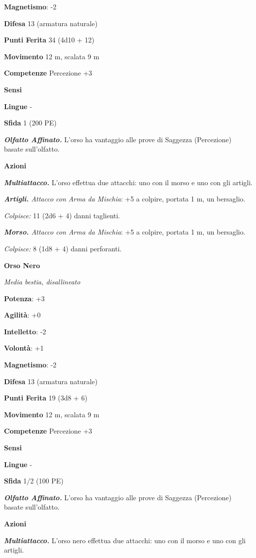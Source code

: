 \begin{multicols}{2}
\textbf{Magnetismo}: -2

\textbf{Difesa} 13 (armatura naturale)

\textbf{Punti Ferita} 34 (4d10 + 12)

\textbf{Movimento} 12 m, scalata 9 m

\textbf{Competenze} Percezione +3

\textbf{Sensi} 

\textbf{Lingue} -

\textbf{Sfida} 1 (200 PE)\smallskip

\emph{\textbf{Olfatto Affinato.}} L'orso ha vantaggio alle prove di
Saggezza (Percezione) basate sull'olfatto.

\smallskip\textbf{Azioni}

\emph{\textbf{Multiattacco.}} L'orso effettua due attacchi: uno con il
morso e uno con gli artigli.

\emph{\textbf{Artigli.} Attacco con Arma da Mischia}: +5 a colpire,
portata 1 m, un bersaglio.

\emph{Colpisce:} 11 (2d6 + 4) danni taglienti.

\emph{\textbf{Morso.} Attacco con Arma da Mischia}: +5 a colpire,
portata 1 m, un bersaglio.

\emph{Colpisce:} 8 (1d8 + 4) danni perforanti.

\textbf{Orso Nero}

\emph{Media bestia, disallineato}

\textbf{Potenza}: +3

\textbf{Agilità}: +0

\textbf{Intelletto}: -2

\textbf{Volontà}: +1

\textbf{Magnetismo}: -2

\textbf{Difesa} 13 (armatura naturale)

\textbf{Punti Ferita} 19 (3d8 + 6)

\textbf{Movimento} 12 m, scalata 9 m

\textbf{Competenze} Percezione +3

\textbf{Sensi} 

\textbf{Lingue} -

\textbf{Sfida} 1/2 (100 PE)\smallskip

\emph{\textbf{Olfatto Affinato.}} L'orso ha vantaggio alle prove di
Saggezza (Percezione) basate sull'olfatto.

\smallskip\textbf{Azioni}

\emph{\textbf{Multiattacco.}} L'orso nero effettua due attacchi: uno con
il morso e uno con gli artigli.


\end{multicols}
